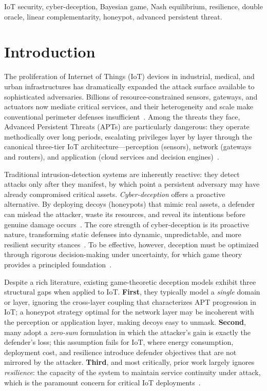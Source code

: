 \documentclass[conference]{IEEEtran}
\begin{document}
\begin{IEEEkeywords}
IoT security, cyber-deception, Bayesian game, Nash equilibrium, resilience,
double oracle, linear complementarity, honeypot, advanced persistent threat.
\end{IEEEkeywords}

\section{Introduction}

The proliferation of Internet of Things (IoT) devices in industrial,
medical, and urban infrastructures has dramatically expanded the attack
surface available to sophisticated adversaries. Billions of resource-constrained
sensors, gateways, and actuators now mediate critical services, and their
heterogeneity and scale make conventional perimeter defenses
insufficient~\cite{pawlick2019}. Among the threats they face, Advanced
Persistent Threats (APTs) are particularly dangerous: they operate methodically
over long periods, escalating privileges layer by layer through the canonical
three-tier IoT architecture---perception (sensors), network (gateways and
routers), and application (cloud services and decision engines)~\cite{wan2022}.

Traditional intrusion-detection systems are inherently reactive: they detect
attacks only after they manifest, by which point a persistent adversary may
have already compromised critical assets. \emph{Cyber-deception} offers a
proactive alternative. By deploying decoys (honeypots) that mimic real assets,
a defender can mislead the attacker, waste its resources, and reveal its
intentions before genuine damage occurs~\cite{anwar2020,sayed2023}. The core
strength of cyber-deception is its proactive nature, transforming static
defenses into dynamic, unpredictable, and more resilient security
stances~\cite{asghar2025}. To be effective, however, deception must be
optimized through rigorous decision-making under uncertainty, for which game
theory provides a principled foundation~\cite{huang2019}.

Despite a rich literature, existing game-theoretic deception models exhibit
three structural gaps when applied to IoT. \textbf{First}, they typically
model a \emph{single} domain or layer, ignoring the cross-layer coupling that
characterizes APT progression in IoT; a honeypot strategy optimal for the
network layer may be incoherent with the perception or application layer,
making decoys easy to unmask. \textbf{Second}, many adopt a \emph{zero-sum}
formulation in which the attacker's gain is exactly the defender's loss; this
assumption fails for IoT, where energy consumption, deployment cost, and
resilience introduce defender objectives that are not mirrored by the attacker.
\textbf{Third}, and most critically, prior work largely ignores
\emph{resilience}: the capacity of the system to maintain service continuity
under attack, which is the paramount concern for critical IoT
deployments~\cite{he2026}.
\end{document}
